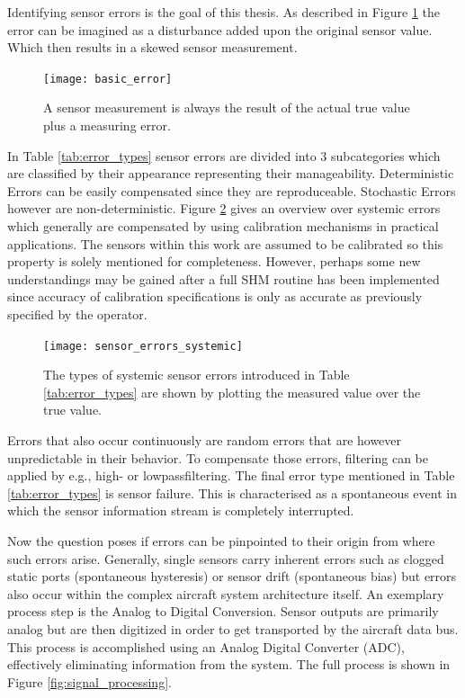 Identifying sensor errors is the goal of this thesis. As described in Figure \ref{fig:basic_error} the error can be imagined as a disturbance added upon the original sensor value. Which then results in a skewed sensor measurement.
\begin{figure}[b]
    \centering
    \texttt{[image: basic\_error]}
    \caption{A sensor measurement is always the result of the actual true value plus a measuring error.}
    \label{fig:basic_error}
\end{figure}
In Table \ref{tab:error_types} sensor errors are divided into 3 subcategories which are classified by their appearance representing their manageability. Deterministic Errors can be easily compensated since they are reproduceable. Stochastic Errors however are non-deterministic. Figure \ref{fig:sensor_errors_systemic} gives an overview over systemic errors which generally are compensated by using calibration mechanisms in practical applications. The sensors within this work are assumed to be calibrated so this property is solely mentioned for completeness. However, perhaps some new understandings may be gained after a full SHM routine has been implemented since accuracy of calibration specifications is only as accurate as previously specified by the operator.

\begin{figure}[h]
    \centering
    \texttt{[image: sensor\_errors\_systemic]}
    \caption[Systemic Sensor Errors]{The types of systemic sensor errors introduced in Table \ref{tab:error_types} are shown by plotting the measured value over the true value. \cite{hartmann_navigation-sensordatenfusion_2022, din_din_1995} }
    \label{fig:sensor_errors_systemic}
\end{figure}

Errors that also occur continuously are random errors that are however unpredictable in their behavior. To compensate those errors, filtering can be applied by e.g., high- or lowpassfiltering. The final error type mentioned in Table \ref{tab:error_types} is sensor failure. This is characterised as a spontaneous event in which the sensor information stream is completely interrupted.


Now the question poses if errors can be pinpointed to their origin from where such errors arise. Generally, single sensors carry inherent errors such as clogged static ports (spontaneous hysteresis) or sensor drift (spontaneous bias) but errors also occur within the complex aircraft system architecture itself. An exemplary process step is the Analog to Digital Conversion. Sensor outputs are primarily analog but are then digitized in order to get transported by the aircraft data bus. This process is accomplished using an Analog Digital Converter (ADC), effectively eliminating information from the system. The full process is shown in Figure \ref{fig:signal_processing}.

